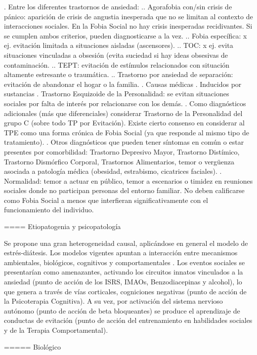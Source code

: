 . Entre los diferentes trastornos de ansiedad:
.. Agorafobia con/sin crisis de pánico: aparición de crisis de angustia inesperada que no se limitan al contexto de interacciones sociales. En la Fobia Social no hay crisis inesperadas recidivantes. Si se cumplen ambos criterios, pueden diagnosticarse a la vez.
.. Fobia específica: x ej. evitación limitada a situaciones aisladas (ascensores).
.. TOC: x ej. evita situaciones vinculadas a obsesión (evita suciedad si hay ideas obsesivas de contaminación.
.. TEPT: evitación de estímulos relacionados con situación altamente estresante o traumática.
.. Trastorno por ansiedad de separación: evitación de abandonar el hogar o la familia.
. Causas médicas
. Inducidos por sustancias
. Trastorno Esquizoide de la Personalidad: se evitan situaciones sociales por falta de interés por relacionarse con los demás.
. Como diagnósticos adicionales (más que diferenciales) considerar Trastorno de la Personalidad del grupo C (sobre todo TP por Evitación). Existe cierto consenso en considerar al TPE como una forma crónica de Fobia Social (ya que responde al mismo tipo de tratamiento).
. Otros diagnósticos que pueden tener síntomas en común o estar presentes por comorbilidad: Trastorno Depresivo Mayor, Trastorno Distímico, Trastorno Dismórfico Corporal, Trastornos Alimentarios, temor o vergüenza asociada a patología médica (obesidad, estrabismo, cicatrices faciales).
. Normalidad: temor a actuar en público, temor a escenarios o timidez en reuniones sociales donde no participan personas del entorno familiar. No deben calificarse como Fobia Social a menos que interfieran significativamente con el funcionamiento del individuo.

==== Etiopatogenia y psicopatología

Se propone una gran heterogeneidad causal, aplicándose en general el modelo de estrés-diátesis. Los modelos vigentes apuntan a interacción entre mecanismos ambientales, biológicos, cognitivos y comportamentales . Los eventos sociales se presentarían como amenazantes, activando los circuitos innatos vinculados a la ansiedad (punto de acción de los ISRS, IMAOs, Benzodiacepinas y alcohol), lo que genera a través de vías corticales, cogniciones negativas (punto de acción de la Psicoterapia Cognitiva). A su vez, por activación del sistema nervioso autónomo (punto de acción de beta bloqueantes) se produce el aprendizaje de conductas de evitación (punto de acción del entrenamiento en habilidades sociales y de la Terapia Comportamental).

===== Biológico

